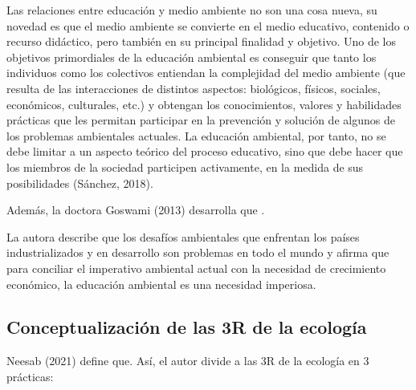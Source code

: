 Las relaciones entre educación y medio ambiente no son una cosa nueva, su novedad es que el medio ambiente se convierte en el medio educativo, contenido o recurso didáctico, pero también en su principal finalidad y objetivo. Uno de los objetivos primordiales de la educación ambiental es conseguir que tanto los individuos como los colectivos entiendan la complejidad del medio ambiente (que resulta de las interacciones de distintos aspectos: biológicos, físicos, sociales, económicos, culturales, etc.) y obtengan los conocimientos, valores y habilidades prácticas que les permitan participar en la prevención y solución de algunos de los problemas ambientales actuales. La educación ambiental, por tanto, no se debe limitar a un aspecto teórico del proceso educativo, sino que debe hacer que los miembros de la sociedad participen activamente, en la medida de sus posibilidades (Sánchez, 2018).

Además, la doctora Goswami (2013) desarrolla que .

La autora describe que los desafíos ambientales que enfrentan los países industrializados y en desarrollo son problemas  en todo el mundo y afirma que para conciliar el imperativo ambiental actual con la necesidad de crecimiento económico, la educación ambiental es una necesidad imperiosa.

\subsection{Conceptualización de las 3R de la ecología}

Neesab (2021) define que. Así, el autor divide a las 3R de la ecología en 3 prácticas:

